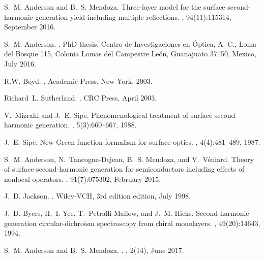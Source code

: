 \documentclass[aps,pra,10pt,amsmath,twocolumn,letterpaper]{revtex4-1}
\begin{document}

\begin{thebibliography}{10}

S.~M. Anderson and B.~S. Mendoza.
\newblock Three-layer model for the surface second-harmonic generation yield
  including multiple reflections.
, 94(11):115314, September 2016.

S.~M. Anderson.
.
\newblock PhD thesis, Centro de Investigaciones en {\'Optica}, {A. C.}, Loma
  del Bosque 115, Colonia Lomas del Campestre Le{\'o}n, Guanajuato 37150,
  Mexico, July 2016.

R.W. Boyd.
.
\newblock Academic Press, New York, 2003.

Richard~L. Sutherland.
.
\newblock CRC Press, April 2003.

V.~Mizrahi and J.~E. Sipe.
\newblock Phenomenological treatment of surface second-harmonic generation.
, 5(3):660--667, 1988.

J.~E. Sipe.
\newblock New {Green}-function formalism for surface optics.
, 4(4):481--489,
  1987.

S.~M. Anderson, N.~Tancogne-Dejean, B.~S. Mendoza, and V.~V{\'e}niard.
\newblock Theory of surface second-harmonic generation for semiconductors
  including effects of nonlocal operators.
, 91(7):075302, February 2015.

J.~D. Jackson.
.
\newblock Wiley-VCH, 3rd edition edition, July 1998.

J.~D. Byers, H.~I. Yee, T.~Petralli-Mallow, and J.~M. Hicks.
\newblock Second-harmonic generation circular-dichroism spectroscopy from
  chiral monolayers.
, 49(20):14643, 1994.

S.~M. Anderson and B.~S. Mendoza.
.
, 2(14), June 2017.

\end{thebibliography}
\end{document}
